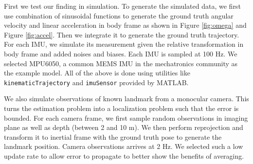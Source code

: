 \documentclass[conference]{IEEEtran}
\begin{document}
First we test our finding in simulation. To generate the simulated data, we first use combination of sinusoidal functions to generate the ground truth angular velocity and linear acceleration in body frame as shown in Figure \ref{fig:omega} and Figure \ref{fig:accel}. Then we integrate it to generate the ground truth trajectory.
For each IMU, we simulate its measurement given the relative transformation in body frame and added noises and biases. Each IMU is sampled at 100 Hz. We selected MPU6050, a common MEMS IMU in the mechatronics community as the example model. All of the above is done using utilities like \texttt{kinematicTrajectory} and \texttt{imuSensor} provided by MATLAB.

We also simulate observations of known landmark from a monocular camera. This turns the estimation problem into a localization problem such that the error is bounded. For each camera frame, we first sample random observations in imaging plane as well as depth (between 2 and 10 m). We then perform reprojection and transform it to inertial frame with the ground truth pose to generate the landmark position. Camera observations arrives at 2 Hz. We selected such a low update rate to allow error to propagate to better show the benefits of averaging.

\end{document}
